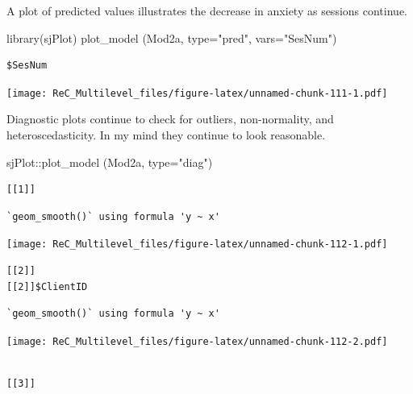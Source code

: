 \documentclass[
  11pt,
]{book}
\newenvironment{Shaded}{\begin{snugshade}}{\end{snugshade}}
\newcommand{\AttributeTok}[1]{\textcolor[rgb]{0.77,0.63,0.00}{#1}}
\newcommand{\FunctionTok}[1]{\textcolor[rgb]{0.00,0.00,0.00}{#1}}
\newcommand{\NormalTok}[1]{#1}
\newcommand{\SpecialCharTok}[1]{\textcolor[rgb]{0.00,0.00,0.00}{#1}}
\newcommand{\StringTok}[1]{\textcolor[rgb]{0.31,0.60,0.02}{#1}}
\begin{document}
A plot of predicted values illustrates the decrease in anxiety as sessions continue.

\begin{Shaded}
\begin{Highlighting}[]
\FunctionTok{library}\NormalTok{(sjPlot)}
\FunctionTok{plot\_model}\NormalTok{ (Mod2a, }\AttributeTok{type=}\StringTok{"pred"}\NormalTok{, }\AttributeTok{vars=}\StringTok{"SesNum"}\NormalTok{)}
\end{Highlighting}
\end{Shaded}

\begin{verbatim}
$SesNum
\end{verbatim}

\texttt{[image: ReC\_Multilevel\_files/figure-latex/unnamed-chunk-111-1.pdf]}

Diagnostic plots continue to check for outliers, non-normality, and heteroscedasticity. In my mind they continue to look reasonable.

\begin{Shaded}
\begin{Highlighting}[]
\NormalTok{sjPlot}\SpecialCharTok{::}\FunctionTok{plot\_model}\NormalTok{ (Mod2a, }\AttributeTok{type=}\StringTok{"diag"}\NormalTok{)}
\end{Highlighting}
\end{Shaded}

\begin{verbatim}
[[1]]
\end{verbatim}

\begin{verbatim}
`geom_smooth()` using formula 'y ~ x'
\end{verbatim}

\texttt{[image: ReC\_Multilevel\_files/figure-latex/unnamed-chunk-112-1.pdf]}

\begin{verbatim}
[[2]]
[[2]]$ClientID
\end{verbatim}

\begin{verbatim}
`geom_smooth()` using formula 'y ~ x'
\end{verbatim}

\texttt{[image: ReC\_Multilevel\_files/figure-latex/unnamed-chunk-112-2.pdf]}

\begin{verbatim}

[[3]]
\end{verbatim}
\end{document}
